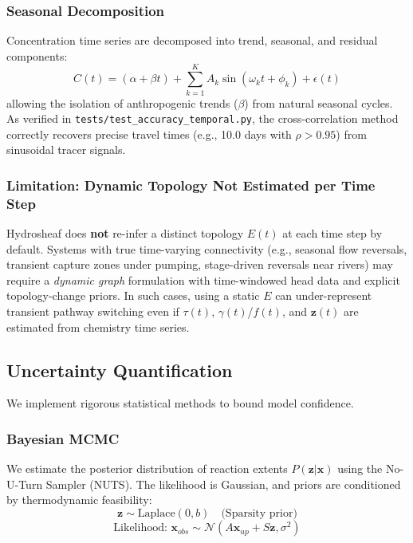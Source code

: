 \documentclass[12pt,a4paper]{article}
\theoremstyle{plain}
\theoremstyle{definition}
\theoremstyle{remark}
\begin{document}
\subsubsection{Seasonal Decomposition}

Concentration time series are decomposed into trend, seasonal, and residual components:
\begin{equation}
	C(t) = (\alpha + \beta t) + \sum_{k=1}^K A_k \sin(\omega_k t + \phi_k) + \epsilon(t)
\end{equation}
allowing the isolation of anthropogenic trends ($\beta$) from natural seasonal cycles. As verified in \texttt{tests/test\_accuracy\_temporal.py}, the cross-correlation method correctly recovers precise travel times (e.g., 10.0 days with $\rho > 0.95$) from sinusoidal tracer signals.

\subsubsection{Limitation: Dynamic Topology Not Estimated per Time Step}

Hydrosheaf does \textbf{not} re-infer a distinct topology $E(t)$ at each time step by default. Systems with true time-varying connectivity (e.g., seasonal flow reversals, transient capture zones under pumping, stage-driven reversals near rivers) may require a \textit{dynamic graph} formulation with time-windowed head data and explicit topology-change priors. In such cases, using a static $E$ can under-represent transient pathway switching even if $\tau(t)$, $\gamma(t)$/$f(t)$, and $\mathbf{z}(t)$ are estimated from chemistry time series.

\subsection{Uncertainty Quantification}

We implement rigorous statistical methods to bound model confidence.

\subsubsection{Bayesian MCMC}

We estimate the posterior distribution of reaction extents $P(\mathbf{z}|\mathbf{x})$ using the No-U-Turn Sampler (NUTS). The likelihood is Gaussian, and priors are conditioned by thermodynamic feasibility:
\begin{equation}
	\mathbf{z} \sim \text{Laplace}(0, b) \quad \text{(Sparsity prior)}
\end{equation}
\begin{equation}
	\text{Likelihood: } \mathbf{x}_{obs} \sim \mathcal{N}(A\mathbf{x}_{up} + S\mathbf{z}, \sigma^2)
\end{equation}
\end{document}
